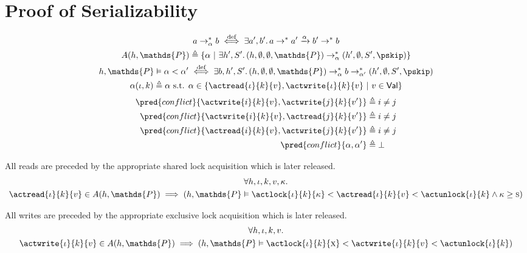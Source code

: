\section{Proof of Serializability}

\begin{gather*}
a \rightarrow^*_\alpha b \overset{\text{def}}{\iff} \exists a', b' \ldotp a \rightarrow^* a' \xrightarrow{\alpha} b' \rightarrow^* b
\\
A(h, \mathds{P}) \triangleq \{ \alpha\ |\ \exists h', S' \ldotp (h, \emptyset, \emptyset, \mathds{P}) \rightarrow_\alpha^* (h', \emptyset, S', \pskip) \} 
\\
h, \mathds{P} \vDash \alpha < \alpha' \overset{\text{def}}{\iff} \exists b, h', S' \ldotp (h, \emptyset, \emptyset, \mathds{P}) \rightarrow_\alpha^* b \rightarrow^*_{\alpha'} (h', \emptyset, S', \pskip)
\\
\alpha(\iota, k) \triangleq \alpha \text{ s.t. } \alpha \in \{ \actread{\iota}{k}{v}, \actwrite{\iota}{k}{v}\ |\ v \in \mathsf{Val} \}
\end{gather*}
\begin{align*}
\pred{conflict}{\actwrite{i}{k}{v}, \actwrite{j}{k}{v'}} &\triangleq i \neq j
\\
\pred{conflict}{\actwrite{i}{k}{v}, \actread{j}{k}{v'}} &\triangleq i \neq j
\\
\pred{conflict}{\actread{i}{k}{v}, \actwrite{j}{k}{v'}} &\triangleq i \neq j
\\
\pred{conflict}{\alpha, \alpha'} &\triangleq \bot 
\end{align*}

\lem All reads are preceded by the appropriate shared lock acquisition which is later released.
\begin{gather*}
\forall h, \iota, k, v, \kappa \ldotp \\
\actread{\iota}{k}{v} \in A(h, \mathds{P}) \implies \left( h, \mathds{P} \vDash \actlock{\iota}{k}{\kappa} < \actread{\iota}{k}{v} < \actunlock{\iota}{k} \land \kappa \geq \textsc{s} \right)
\end{gather*}

\lem All writes are preceded by the appropriate exclusive lock acquisition which is later released.
\begin{gather*}
\forall h, \iota, k, v \ldotp \\
\actwrite{\iota}{k}{v} \in A(h, \mathds{P}) \implies \left( h, \mathds{P} \vDash \actlock{\iota}{k}{\textsc{x}} < \actwrite{\iota}{k}{v} < \actunlock{\iota}{k} \right)
\end{gather*}

